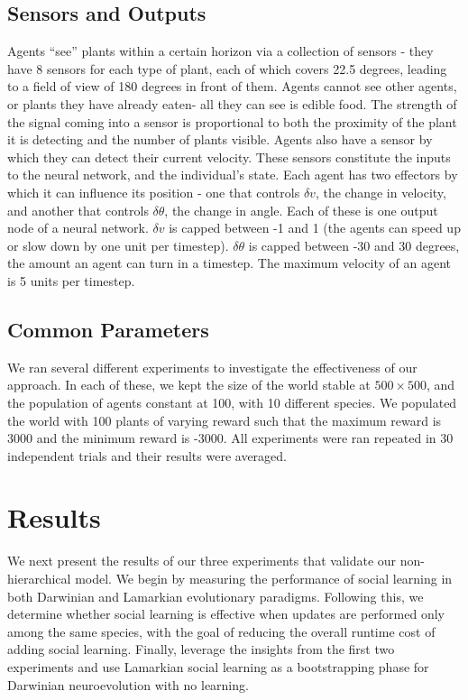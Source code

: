 \documentclass{acm_proc_article-sp}
\begin{document}
\subsection*{Sensors and Outputs} 
  Agents ``see'' plants within a certain horizon via a collection of sensors - they have 8 sensors for each type of plant, each of which covers 22.5 degrees, leading to a field of view of 180 degrees in front of them.  Agents cannot see other agents, or plants they have already eaten- all they can see is edible food.  The strength of the signal coming into a sensor is proportional to both the proximity of the plant it is detecting and the number of plants visible.
   Agents also have a sensor by which they can detect their current velocity. These sensors constitute the inputs to the neural network, and the individual's state. Each agent has two effectors by which it can influence its position - one that controls $\delta v$, the change in velocity, and another that controls $\delta \theta$, the change in angle.
Each of these is one output node of a neural network. $\delta v$ is capped between -1 and 1 (the agents can speed up or slow down by one unit per timestep).  $\delta \theta$ is capped between -30 and 30 degrees, the amount an agent can turn in a timestep.  The maximum velocity of an agent is 5 units per timestep.

\subsection*{Common Parameters} 
We ran several different experiments to investigate the effectiveness of our approach.
In each of these, we kept the size of the world stable at $500\times500$, and the population of agents constant at 100, with 10 different species.
We populated the world with 100 plants of varying reward such that the maximum reward is 3000 and the minimum reward is -3000.
All experiments were ran repeated in 30 independent trials and their results were averaged.

\section{Results}
\label{sec:results}
We next present the results of our three experiments that validate our non-hierarchical model. We begin by measuring the performance of social learning in both Darwinian and Lamarkian evolutionary paradigms. Following this, we determine whether social learning is effective when updates are performed only among the same species, with the goal of reducing the overall runtime cost of adding social learning. Finally, leverage the insights from the first two experiments and use Lamarkian social learning as a bootstrapping phase for Darwinian neuroevolution with no learning.
\end{document}
